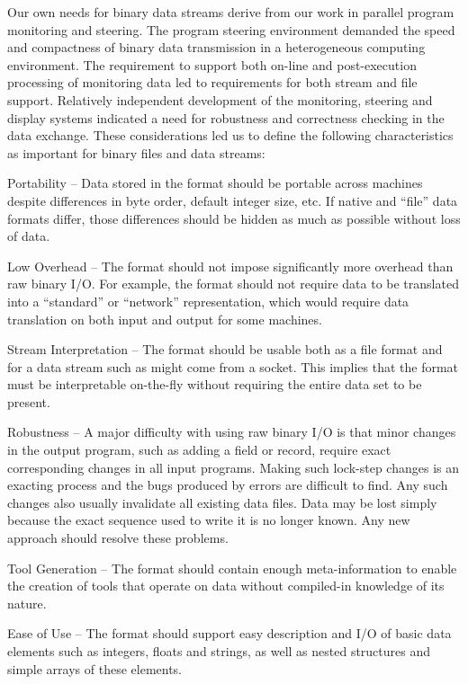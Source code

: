 \documentclass{article}
\begin{document}
Our own needs for binary data streams derive from our work in parallel program 
monitoring and steering.  The program steering environment demanded the speed
and compactness of binary data transmission in a heterogeneous computing
environment.  The requirement to support both on-line and post-execution
processing of monitoring data led to requirements for both stream and file
support.  Relatively independent development of the monitoring, steering and
display systems indicated a need for robustness and correctness checking in
the data exchange.  These considerations led us to define the following
characteristics as important for binary files and data streams: 
\begin{list}{}{\let\makelabel\descriptionlabel\setlength{\itemsep}{0in}\setlength{\topsep}{0in}}
\item[Portability --]
        Data stored in the format should be portable across machines despite
differences in byte order, default integer size, etc.  If native and ``file''
data formats differ, those differences should be hidden as much as possible
without loss of data.
\item[Low Overhead --]
        The format should not impose significantly more overhead than raw
binary I/O.  For example, the format should not require data to be translated
into a ``standard'' or ``network'' representation, which would require data
translation on both input and output for some machines.
\item[Stream Interpretation --]
        The format should be usable both as a file format and for a data
stream such as might come from a socket.  This implies that the format must be
interpretable on-the-fly without requiring the entire data set to be present.
\item[Robustness --]
        A major difficulty with using raw binary I/O is that minor changes in
the output program, such as adding a field or record, require exact
corresponding changes in all input programs.  Making such lock-step changes is
an exacting process and the bugs produced by errors are difficult to find.  Any
such changes also usually invalidate all existing data files.  Data may be
lost simply because the exact sequence used to write it is no longer known.
Any new approach should resolve these problems.
\item[Tool Generation --]
        The format should contain enough meta-information to enable
the creation of tools that operate on data without compiled-in knowledge of
its nature.
\item[Ease of Use --]
        The format should support easy description and I/O of basic data
elements such as integers, floats and strings, as well as nested structures
and simple arrays of these elements.
\end{list}
\end{document}
